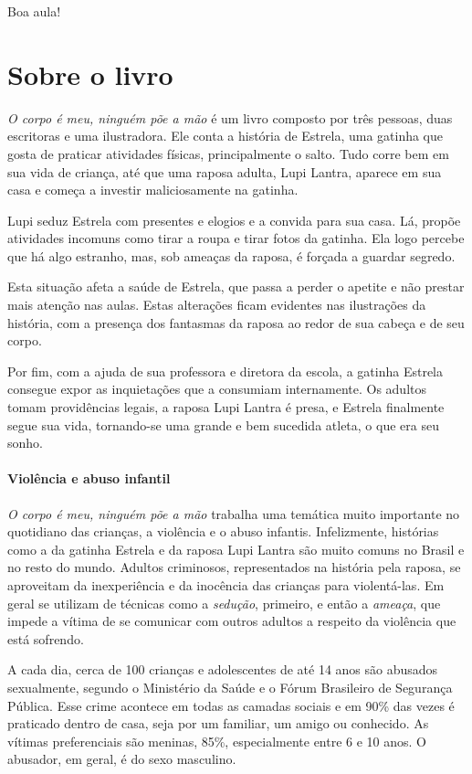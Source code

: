 \documentclass[11pt]{extarticle}
\begin{document}
Boa aula!


\section{Sobre o livro}

\textit{O corpo é meu, ninguém põe a mão} é um livro composto por três pessoas,
duas escritoras e uma ilustradora. Ele conta a história de Estrela, uma gatinha 
que gosta de praticar atividades físicas, principalmente o salto. Tudo corre bem
em sua vida de criança, até que uma raposa adulta, Lupi Lantra, aparece em sua casa e começa
a investir maliciosamente na gatinha. 

Lupi seduz Estrela com presentes e elogios e a convida para sua casa. Lá,
propõe atividades incomuns como tirar a roupa e tirar fotos da gatinha.
Ela logo percebe que há algo estranho, mas, sob ameaças da raposa, 
é forçada a guardar segredo. 

Esta situação afeta a saúde de Estrela, que passa a perder o apetite e não
prestar mais atenção nas aulas. Estas alterações ficam evidentes nas ilustrações 
da história, com a presença dos fantasmas da raposa ao redor de sua cabeça e
de seu corpo. 

Por fim, com a ajuda de sua professora e diretora da escola, a gatinha
Estrela consegue expor as inquietações que a consumiam internamente. Os adultos tomam providências legais,
a raposa Lupi Lantra é presa, e Estrela finalmente segue sua vida,
tornando-se uma grande e bem sucedida atleta, o que era seu sonho. 

\paragraph{Violência e abuso infantil} \textit{O corpo é meu, ninguém põe a mão} trabalha uma
temática muito importante no quotidiano das crianças, a violência e o abuso infantis.
Infelizmente, histórias como a da gatinha Estrela e da raposa Lupi Lantra são
muito comuns no Brasil e no resto do mundo. Adultos criminosos, representados
na história pela raposa, se aproveitam da inexperiência e da inocência
das crianças para violentá-las. 
Em geral se utilizam de técnicas como a \textit{sedução}, primeiro, e então 
a \textit{ameaça}, que impede a vítima de se comunicar com outros adultos
a respeito da violência que está sofrendo. 

A cada dia, cerca de 100 crianças e adolescentes de até 14 anos são abusados sexualmente, segundo o Ministério da Saúde e o Fórum Brasileiro de Segurança Pública. Esse crime acontece em todas as camadas sociais e em 90\% das vezes é praticado dentro de casa, seja por um familiar, um amigo ou conhecido. As vítimas preferenciais são meninas, 85\%, especialmente entre 6 e 10 anos. O abusador, em geral, é do sexo masculino.
\end{document}
